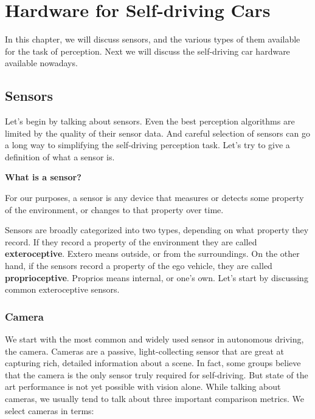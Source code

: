 \section{Hardware for Self-driving Cars}
\label{hardware_for_self_driving_cars}

In this chapter, we will discuss sensors, and the various types of them
available for the task of perception. Next we will discuss the self-driving car hardware available nowadays. 

\subsection{Sensors}
\label{sensors}

Let's begin by talking about sensors. Even the best perception algorithms
are limited by the quality of their sensor data. And careful selection of sensors
can go a long way to simplifying the self-driving perception task. Let's try to give a definition of
what a sensor is.


\begin{framed}
\theoremstyle{definition}
\begin{definition}{\textbf{What is a sensor? }}

For our purposes, a sensor is any device that measures or
detects some property of the environment, or changes to that property over time.
\end{definition}
\end{framed}

Sensors are broadly categorized into two types, depending on what property they record. If they record a property of
the environment they are called {\textbf{exteroceptive}}. Extero means outside, or from the surroundings. On the other hand, if the sensors
record a property of the ego vehicle, they are called {\textbf{proprioceptive}}. Proprios means internal, or one's own. Let's start by discussing
common exteroceptive sensors. 

\subsubsection{Camera}

We start with the most common and widely used sensor in autonomous driving, the camera. Cameras are a passive, light-collecting
sensor that are great at capturing rich, detailed information about a scene. In fact, some groups believe that the
camera is the only sensor truly required for self-driving. But state of the art performance is
not yet possible with vision alone. While talking about cameras, we usually tend to talk about three
important comparison metrics. We select cameras in terms:


